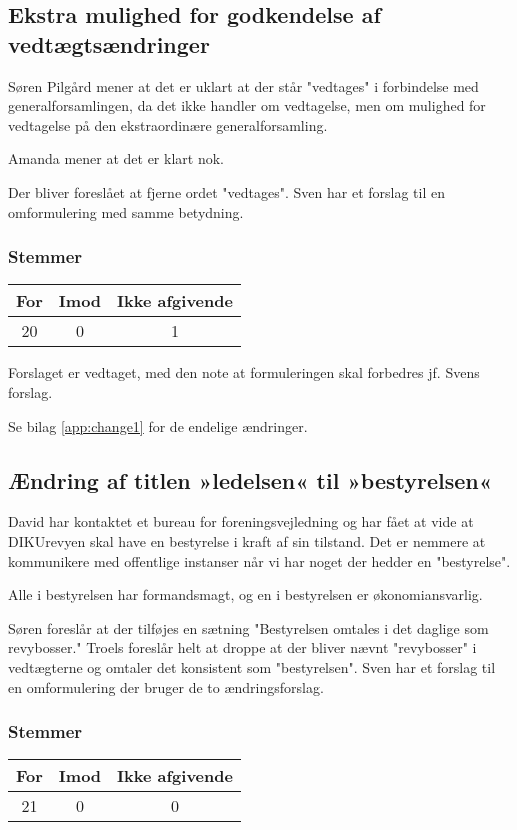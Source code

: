 \documentclass[a4paper,11pt]{report}
\begin{document}
\subsection*{Ekstra mulighed for godkendelse af vedtægtsændringer}

Søren Pilgård mener at det er uklart at der står "vedtages" i forbindelse med
generalforsamlingen, da det ikke handler om vedtagelse, men om mulighed for
vedtagelse på den ekstraordinære generalforsamling.

Amanda mener at det er klart nok.

Der bliver foreslået at fjerne ordet "vedtages".  Sven har et forslag til en
omformulering med samme betydning.

\subsubsection*{Stemmer}
\begin{tabular}{ c | c | c }
For & Imod & Ikke afgivende \\
\hline
20 & 0 & 1 \\
\end{tabular}

Forslaget er vedtaget, med den note at formuleringen skal forbedres jf. Svens
forslag.

Se bilag \ref{app:change1} for de endelige ændringer.

\subsection*{Ændring af titlen »ledelsen« til »bestyrelsen«}

David har kontaktet et bureau for foreningsvejledning og har fået at vide at
DIKUrevyen skal have en bestyrelse i kraft af sin tilstand.  Det er nemmere at
kommunikere med offentlige instanser når vi har noget der hedder en
"bestyrelse".

Alle i bestyrelsen har formandsmagt, og en i bestyrelsen er økonomiansvarlig.

Søren foreslår at der tilføjes en sætning "Bestyrelsen omtales i det daglige som
revybosser."  Troels foreslår helt at droppe at der bliver nævnt "revybosser" i
vedtægterne og omtaler det konsistent som "bestyrelsen".  Sven har et forslag
til en omformulering der bruger de to ændringsforslag.

\subsubsection*{Stemmer}
\begin{tabular}{ c | c | c }
For & Imod & Ikke afgivende \\
\hline
21 & 0 & 0 \\
\end{tabular}
\end{document}
